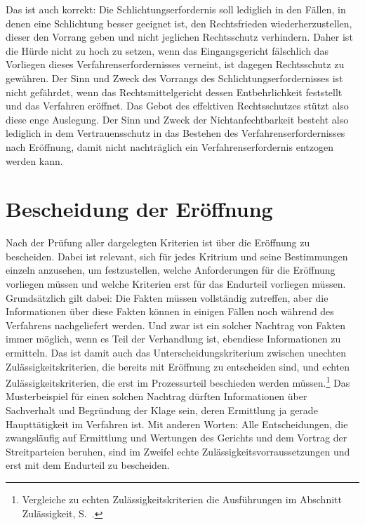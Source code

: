 Das ist auch korrekt:
Die Schlichtungserfordernis soll lediglich in den Fällen, in denen eine Schlichtung besser geeignet ist, den Rechtsfrieden wiederherzustellen, dieser den Vorrang geben und nicht jeglichen Rechtsschutz verhindern.
Daher ist die Hürde nicht zu hoch zu setzen, wenn das Eingangsgericht fälschlich das Vorliegen dieses Verfahrenserfordernisses verneint, ist dagegen Rechtsschutz zu gewähren.
Der Sinn und Zweck des Vorrangs des Schlichtungserfordernisses ist nicht gefährdet, wenn das Rechtsmittelgericht dessen Entbehrlichkeit feststellt und das Verfahren eröffnet.
Das Gebot des effektiven Rechtsschutzes stützt also diese enge Auslegung. Der Sinn und Zweck der Nichtanfechtbarkeit besteht also lediglich in dem Vertrauensschutz in das Bestehen des Verfahrenserfordernisses nach Eröffnung, damit nicht nachträglich ein Verfahrenserfordernis entzogen werden kann.

\section{Bescheidung der Eröffnung}
\label{Anrufung:Beschluss}
Nach der Prüfung aller dargelegten Kriterien ist über die Eröffnung zu bescheiden.
Dabei ist relevant, sich für jedes Kritrium und seine Bestimmungen einzeln anzusehen, um festzustellen, welche Anforderungen für die Eröffnung vorliegen müssen und welche Kriterien erst für das Endurteil vorliegen müssen.
Grundsätzlich gilt dabei:
Die Fakten müssen vollständig zutreffen, aber die Informationen über diese Fakten können in einigen Fällen noch während des Verfahrens nachgeliefert werden.
Und zwar ist ein solcher Nachtrag von Fakten immer möglich, wenn es Teil der Verhandlung ist, ebendiese Informationen zu ermitteln.
Das ist damit auch das Unterscheidungskriterium zwischen unechten Zulässigkeitskriterien, die bereits mit Eröffnung zu entscheiden sind, und echten Zulässigkeitskriterien, die erst im Prozessurteil beschieden werden müssen.\footnote{Vergleiche zu echten Zulässigkeitskriterien die Ausführungen im Abschnitt Zulässigkeit, S.~\pageref{Zulaessigkeit}.}
Das Musterbeispiel für einen solchen Nachtrag dürften Informationen über Sachverhalt und Begründung der Klage sein, deren Ermittlung ja gerade Haupttätigkeit im Verfahren ist.
Mit anderen Worten:
Alle Entscheidungen, die zwangsläufig auf Ermittlung und Wertungen des Gerichts und dem Vortrag der Streitparteien beruhen, sind im Zweifel echte Zulässigkeitsvorraussetzungen und erst mit dem Endurteil zu bescheiden.

